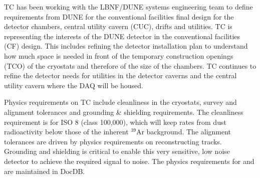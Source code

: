 TC has been working with the LBNF/DUNE systems engineering team to
define requirements from DUNE for the conventional facilities final
design for the detector chambers, central utility cavern (CUC), drifts
and utilities. TC is representing the interests of the DUNE detector
in the conventional facilities (CF) design. This includes refining the
detector installation plan to understand how much space is needed in
front of the temporary construction openings (TCO) of the cryostats
and therefore of the size of the chambers. TC continues to refine the
detector needs for utilities in the detector caverns and the central
utility cavern where the DAQ will be housed.

Physics requirements on TC include cleanliness in the cryostats,
survey and alignment tolerances and grounding \& shielding
requirements. The cleanliness requirement is for ISO 8 (class
100,000), which will keep rates from dust radioactivity below those of
the inherent $^{39}$Ar background. The alignment tolerances are driven
by physics requirements on reconstructing tracks. Grounding and
shielding is critical to enable this very sensitive, low noise
detector to achieve the required signal to noise. The physics
requirements for  and  are maintained in
DocDB.
